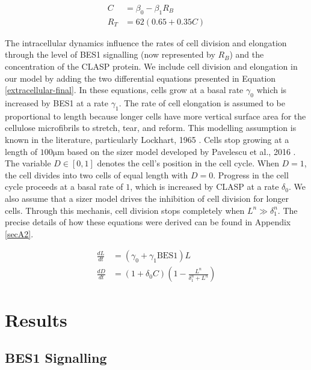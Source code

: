 \documentclass[referee,pdflatex,sn-mathphys-num]{sn-jnl}
\newcommand{\um}{\unit{\micro\metre}}
\begin{document}
\begin{equation}
\label{intracellular-final}
\begin{aligned}
  C &= \beta_{0} - \beta_{1}R_{B} \\[5pt]
  R_{T} &= 62 (0.65 + 0.35 C)
\end{aligned}
\end{equation}

The intracellular dynamics influence the rates of cell division and elongation through the level of BES1 signalling (now represented by $R_{B}$) and the concentration of the CLASP protein. We include cell division and elongation in our model by adding the two differential equations presented in Equation \eqref{extracellular-final}. In these equations, cells grow at a basal rate $\gamma_{0}$ which is increased by BES1 at a rate $\gamma_{1}$. The rate of cell elongation is assumed to be proportional to length because longer cells have more vertical surface area for the cellulose microfibrils to stretch, tear, and reform. This modelling assumption is known in the literature, particularly Lockhart, 1965 \cite{lockhart1965}. Cells stop growing at a length of $100\um$ based on the sizer model developed by Pavelescu et al., 2016 \cite{pavelescu2016}. The variable $D \in [0, 1]$ denotes the cell's position in the cell cycle. When $D = 1$, the cell divides into two cells of equal length with $D = 0$. Progress in the cell cycle proceeds at a basal rate of $1$, which is increased by CLASP at a rate $\delta_{0}$. We also assume that a sizer model drives the inhibition of cell division for longer cells. Through this mechanis, cell division stops completely when $L^{n} \gg \delta_{1}^{n}$. The precise details of how these equations were derived can be found in Appendix \ref{secA2}.

\begin{equation}
\label{extracellular-final}
\begin{aligned}
  \frac{ dL }{ dt } &= \left(\gamma_{0} + \gamma_{1}\text{BES1}\right)L  \\[5pt]
\frac{ dD }{ dt } &= (1 + \delta_{0}C)\left( 1 - \frac{ L^{ n } }{ \delta_{1}^{ n } + L^{ n } } \right) 
\end{aligned}
\end{equation}

\section{Results}\label{sec2}

\subsection{BES1 Signalling}\label{sec21}
\end{document}
